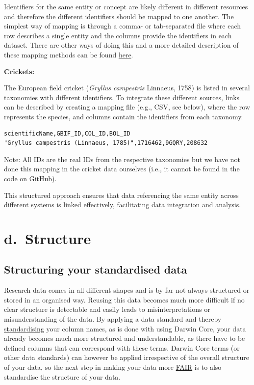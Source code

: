 \documentclass[
]{book}
\begin{document}
Identifiers for the same entity or concept are likely different in different resources and therefore the different identifiers should be mapped to one another. The simplest way of mapping is through a comma- or tab-separated file where each row describes a single entity and the columns provide the identifiers in each dataset. There are other ways of doing this and a more detailed description of these mapping methods can be found \href{https://faircookbook.elixir-europe.org/content/recipes/interoperability/identifier-mapping.html}{here}.

\textbf{Crickets:}

The European field cricket (\emph{Gryllus campestris} Linnaeus, 1758) is listed in several taxonomies with different identifiers. To integrate these different sources, links can be described by creating a mapping file (e.g., CSV, see below), where the row represents the species, and columns contain the identifiers from each taxonomy.

\begin{verbatim}
scientificName,GBIF_ID,COL_ID,BOL_ID
"Gryllus campestris (Linnaeus, 1785)",1716462,9GQRY,208632
\end{verbatim}

Note: All IDs are the real IDs from the respective taxonomies but we have not done this mapping in the cricket data ourselves (i.e., it cannot be found in the code on GitHub).

This structured approach ensures that data referencing the same entity across different systems is linked effectively, facilitating data integration and analysis.

\hypertarget{part-d.-structure}{%
\part*{d.~Structure}\label{part-d.-structure}}

\hypertarget{structuring-your-standardised-data}{%
\chapter{Structuring your standardised data}\label{structuring-your-standardised-data}}

Research data comes in all different shapes and is by far not always structured or stored in an organised way. Reusing this data becomes much more difficult if no clear structure is detectable and easily leads to misinterpretations or misunderstanding of the data. By applying a data standard and thereby \protect\hyperlink{standardise}{standardising} your column names, as is done with using Darwin Core, your data already becomes much more structured and understandable, as there have to be defined columns that can correspond with these terms. Darwin Core terms (or other data standards) can however be applied irrespective of the overall structure of your data, so the next step in making your data more \protect\hyperlink{FAIR}{FAIR} is to also standardise the structure of your data.
\end{document}
